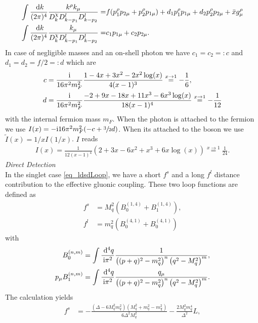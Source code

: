 \begin{appendix}
\begin{align}
\begin{aligned}
 \int\frac{\; \mathrm{d} k}{(2\pi)^4}\frac{ k^\rho k_\mu}{D^\chi_kD^l_{k-p_1}D^l_{k-p_2}} =&  f (p_1^\rho p_{2\mu} + p_2^\rho p_{1\mu}) +  d_1p_1^\rho p_{1\mu} +  d_2p_2^\rho p_{2\mu} + \bar x g^\rho_\mu\\
 \int\frac{\; \mathrm{d} k}{(2\pi)^4}\frac{k_\mu}{D^\chi_kD^l_{k-p_1}D^l_{k-p_2}} =&  c_1 p_{1\mu} +  c_2 p_{2\mu}.
 \end{aligned}
 \label{eq_g2loops}
\end{align}
In case of negligible masses and an on-shell photon we have $c_1=c_2=:c$ and $d_1=d_2=f/2=:d$ which are \cite{Lavoura}
\begin{align}
 c &= \frac{\text{i}}{16\pi^2m_F^2} \frac{1-4x+3x^2-2x^2\log(x)}{4(x-1)^3}\stackrel{x\rightarrow 1}{=} -\frac16,\\
 d &= \frac{\text{i}}{16\pi^2m_F^2} \frac{-2+9x-18x+11x^3 - 6x^3\log(x)}{18(x-1)^4} \stackrel{x\rightarrow 1}{=} -\frac{1}{12}
 \label{eq_loopscd}
\end{align}
with the internal fermion mass $m_F$. When the photon is attached to the fermion we use $I(x) = -\text{i} 16\pi^2m^2_F(-c+\sfrac32 d)$. 
When its attached to the boson we use $\tilde{I}(x)=1/xI(1/x)$. $I$ reads
\begin{align}
 I(x) = \frac{1}{12(x-1)^4}\left(2+3x-6x^2+x^3+6x\log(x) \right) \stackrel{x\rightarrow1}{=} \frac{1}{24}.
 \label{eq_loopmuon}
\end{align}
\textit{Direct Detection}\\
\noindent In the singlet case \eqref{eq_ldsdLoop}, we have a short $f^s$ and a long $f^l$ distance contribution to the effective gluonic coupling. These two loop functions
are defined as \cite{1007.2601}
\begin{align}
 f^s &= M_q^2(B_0^{(1,4)} + B_1^{(1,4)}),\\
 f^l &= m_q^2(B_0^{(4,1)} + B_0^{(4,1)})
 \label{eq_singletloop}
\end{align}
with
\begin{align}
 B_0^{(n,m)} &= \int \frac{\; \mathrm{d}^4 q}{\text{i} \pi^2}\frac{1}{\left((p+q)^2-m_q^2\right)^n\left(q^2-M^2_q\right)^m},\\
 p_\mu B_1^{(n,m)} &= \int \frac{\; \mathrm{d}^4 q}{\text{i} \pi^2}\frac{q_\mu}{\left((p+q)^2-m_q^2\right)^n\left(q^2-M^2_q\right)^m}.
\end{align}
The calculation yields
\begin{align}
 f^s &=-\frac{(\Delta-6M_q^2m_q^2)(M_q^2+m_q^2-m_\chi^2)}{6\Delta^2M_q^2} - \frac{2M_q^2m_q^4}{\Delta^2}L,\\

\end{align}
\end{appendix}
